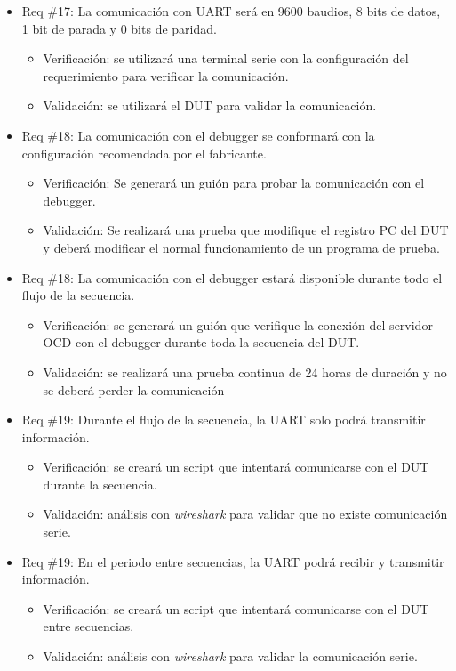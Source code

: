 \documentclass[
11pt, %
]{charter}
\begin{document}
\begin{itemize}
\item Req \#17: La comunicación con UART será en 9600 baudios, 8 bits de datos, 1 bit de parada y 0 bits de paridad.
\begin{itemize}
    \item Verificación: se utilizará una terminal serie con la configuración del requerimiento para verificar la comunicación.
    \item Validación: se utilizará el DUT para validar la comunicación.
\end{itemize}

\item Req \#18: La comunicación con el debugger se conformará con la configuración recomendada por el fabricante.
\begin{itemize}
    \item Verificación: Se generará un guión para probar la comunicación con el debugger.
    \item Validación: Se realizará una prueba que modifique el registro PC del DUT y deberá modificar el normal funcionamiento de un programa de prueba.
\end{itemize}

\item Req \#18: La comunicación con el debugger estará disponible durante todo el flujo de la secuencia.
\begin{itemize}
    \item Verificación: se generará un guión que verifique la conexión del servidor OCD con el debugger durante toda la secuencia del DUT.
    \item Validación: se realizará una prueba continua de 24 horas de duración y no se deberá perder la comunicación
\end{itemize}

\item Req \#19: Durante el flujo de la secuencia, la UART solo podrá transmitir información.
\begin{itemize}
    \item Verificación: se creará un script que intentará comunicarse con el DUT durante la secuencia.
    \item Validación: análisis con \emph{wireshark} para validar que no existe comunicación serie.
\end{itemize}

\item Req \#19: En el periodo entre secuencias, la UART podrá recibir y transmitir información.
\begin{itemize}
    \item Verificación: se creará un script que intentará comunicarse con el DUT entre secuencias.
    \item Validación: análisis con \emph{wireshark} para validar la comunicación serie.
\end{itemize}


\end{itemize}
\end{document}

